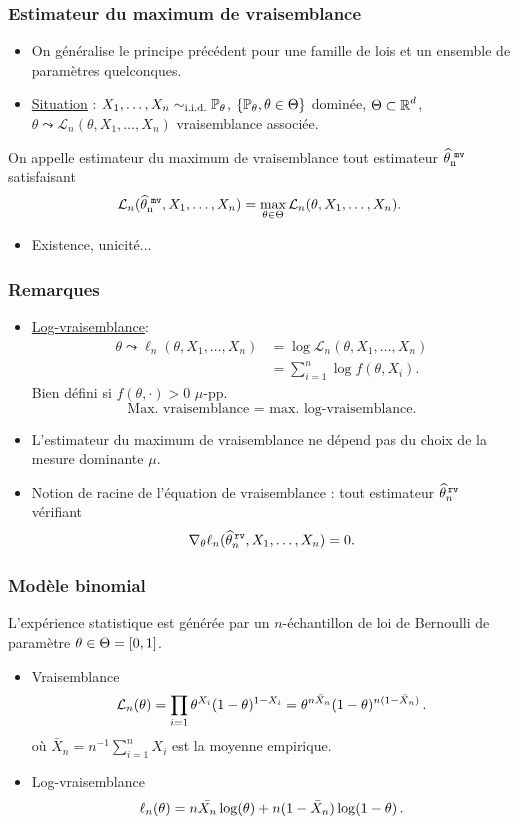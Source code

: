 \begin{frame}
\frametitle{Estimateur du maximum de vraisemblance}
\begin{itemize}
\item On généralise le principe précédent pour une famille de lois et un ensemble de paramètres \alert{quelconques}.
\item \underline{Situation} : $X_1,\ldots, X_n\sim_{\text{i.i.d.}}\operatorname{{\mathbb P}}_\theta$, $\{\operatorname{{\mathbb P}}_\theta,\theta \in \Theta\}$ dominée, $\Theta \subset \operatorname{{\mathbb R}}^d$, $\theta \leadsto {\mathcal L}_n(\theta, X_1,\ldots, X_n)$ vraisemblance associée.
\end{itemize}
\begin{df}
On appelle \alert{ estimateur du maximum de vraisemblance} tout estimateur $\operatorname{\widehat \theta_n^{\,\,{\tt mv}}}$ satisfaisant
$${\mathcal L}_n(\operatorname{\widehat \theta_n^{\,\,{\tt mv}}},X_1,\ldots, X_n) = \max_{\theta \in \Theta} {\mathcal L}_n(\theta, X_1,\ldots, X_n).$$
\end{df}
\begin{itemize}
\item \alert{Existence, unicité...}
\end{itemize}
\end{frame}

\begin{frame}
\frametitle{Remarques}
\begin{itemize}
\item \underline{Log-vraisemblance}:
\begin{align*}\theta \leadsto \ell_n(\theta, X_1,\ldots, X_n)& = \log {\mathcal L}_n(\theta, X_1,\ldots, X_n)\\
& = \sum_{i = 1}^n \log f(\theta, X_i).
\end{align*}
\alert{Bien défini} si $f(\theta, \cdot) >0$ $\mu$-pp.
$$\text{Max. vraisemblance = max. log-vraisemblance.}$$
\item L'estimateur du maximum de vraisemblance \alert{ ne dépend pas} du choix de la mesure dominante $\mu$.
\item Notion de \alert{ racine de l'équation de vraisemblance} : tout estimateur $\widehat \theta_n^{\,{\tt rv}}$ vérifiant
$$\nabla_\theta \ell_n(\widehat \theta_n^{\,{\tt rv}}, X_1,\ldots, X_n) = 0.$$
\end{itemize}
\end{frame}

\begin{frame}
\frametitle{Modèle binomial}
L'expérience statistique est générée par un $n$-échantillon de loi de Bernoulli de paramètre $\theta \in \Theta= \left[0,1\right]$.
\begin{itemize}
\item \alert{Vraisemblance}
$$
\mathcal{L}_n(\theta) = \prod_{i=1} \theta^{X_i} (1-\theta)^{1-X_i} = \theta^{n\bar{X}_n} (1-\theta)^{n (1 - \bar{X}_n)} \,.
$$
où $\bar{X}_n = n^{-1} \sum_{i=1}^n X_i$ est la moyenne empirique.
\item \alert{Log-vraisemblance}
$$
\ell_n(\theta)= n \bar{X_n} \log(\theta) + n (1- \bar{X}_n) \log(1-\theta) \,.
$$
\end{itemize}
\end{frame}

